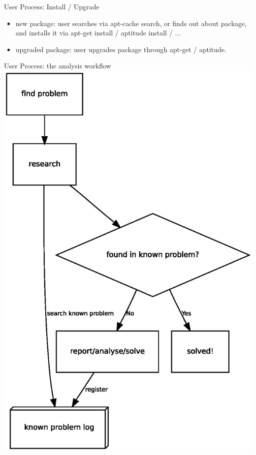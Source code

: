 \documentclass[cjk,dvipdfm,12pt]{beamer}
\begin{document}
\begin{frame}{User Process: Install / Upgrade}
 \begin{itemize}
  \item new package: 
	user searches via apt-cache search, or finds out about package,
	and installs it via apt-get install / aptitude install / ...
  \item upgraded package:
	user upgrades package through 
	apt-get  / aptitude.	
 \end{itemize}
\end{frame}

\begin{frame}{User Process: the analysis workflow}
 \includegraphics[width=0.5\hsize]{image200805/problemcycle-en.eps}
\end{frame}
\end{document}
